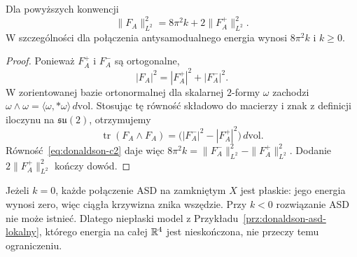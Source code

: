 \begin{stwierdzenie}
\label{prop:donaldson-energy}
Dla powyższych konwencji
\[
 \|F_A\|_{L^2}^2
 =8\pi^2k+2\|F_A^+\|_{L^2}^2.
\]
W szczególności dla połączenia antysamodualnego
energia wynosi $8\pi^2k$ i $k\geq0$.
\end{stwierdzenie}
\begin{proof}
Ponieważ $F_A^+$ i $F_A^-$ są ortogonalne,
\[
 |F_A|^2=|F_A^+|^2+|F_A^-|^2.
\]
W zorientowanej bazie ortonormalnej dla skalarnej
$2$-formy $\omega$ zachodzi
$\omega\wedge\omega=\langle\omega,*\omega\rangle
\,d\mathrm{vol}$. Stosując tę równość składowo
do macierzy i znak z definicji iloczynu na
$\mathfrak{su}(2)$, otrzymujemy
\[
 \operatorname{tr}(F_A\wedge F_A)
 =\bigl(|F_A^-|^2-|F_A^+|^2\bigr)
   \,d\mathrm{vol}.
\]
Równość~\eqref{eq:donaldson-c2} daje więc
$8\pi^2k=\|F_A^-\|_{L^2}^2-\|F_A^+\|_{L^2}^2$.
Dodanie $2\|F_A^+\|_{L^2}^2$ kończy dowód.
\end{proof}

Jeżeli $k=0$, każde połączenie ASD na zamkniętym
$X$ jest płaskie: jego energia wynosi zero, więc
ciągła krzywizna znika wszędzie. Przy $k<0$
rozwiązanie ASD nie może istnieć. Dlatego
niepłaski model z
Przykładu~\ref{prz:donaldson-asd-lokalny},
którego energia na całej $\mathbb{R}^4$ jest nieskończona,
nie przeczy temu ograniczeniu.

